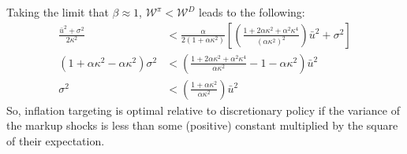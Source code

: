 \documentclass[11pt]{article} %
\begin{document}
Taking the limit that $\beta \approx 1$, $\mathcal{W}^{\pi} < \mathcal{W}^{D} $ leads to the following:
\begin{align*}
\frac{\bar{u}^2 + \sigma^2}{2\kappa^2}&< \frac{\alpha}{2(1+\alpha\kappa^2)} \left[\left(   \frac{1 + 2\alpha\kappa^2 + \alpha^2\kappa^4 }{(\alpha\kappa^2 )^2} \right)\bar{u}^2 + \sigma^2 \right]\\
\left(1+\alpha\kappa^2 - \alpha\kappa^2  \right)\sigma^2 &< \left( \frac{1 + 2\alpha\kappa^2 + \alpha^2\kappa^4 }{\alpha\kappa^2 }  - 1-\alpha\kappa^2\right)\bar{u}^2 \\
\sigma^2 &< \left( \frac{1 + \alpha\kappa^2 }{\alpha\kappa^2 } \right)\bar{u}^2
\end{align*}
So, inflation targeting is optimal relative to discretionary policy if the variance of the markup shocks is less than some (positive) constant multiplied by the square of their expectation.
\end{document}
